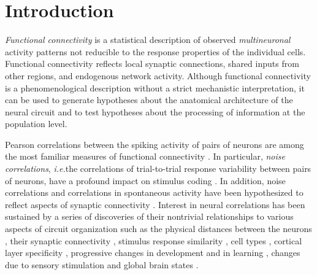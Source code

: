 \section*{Introduction}
\emph{Functional connectivity} is a statistical description of observed \emph{multineuronal} activity patterns not reducible to the response properties of the individual cells. Functional connectivity reflects local synaptic connections, shared inputs from other regions, and endogenous network activity. Although functional connectivity is a phenomenological description without a strict mechanistic interpretation, it can be used to generate hypotheses about the anatomical architecture of the neural circuit and to test hypotheses about the processing of information at the population level.

Pearson correlations between the spiking activity of pairs of neurons are among the most familiar measures of functional connectivity \cite{Averbeck:2006, Zohary:1994, Kohn:2005, Bair:2001, Ecker:2010}.  In particular, \emph{noise correlations}, \emph{i.e.}\;the correlations of trial-to-trial response variability between pairs of neurons, have a profound impact on stimulus coding \cite{Zohary:1994, Abbott:1999, Sompolinsky:2001, Nirenberg:2003, Averbeck:2006, Josic:2009, Berens:2011, Ecker:2011}. In addition, noise correlations and correlations in spontaneous activity have been hypothesized to reflect aspects of synaptic connectivity \cite{Gerstein:1964}.  Interest in neural correlations has been sustained by a series of discoveries of their nontrivial relationships to various aspects of circuit organization such as the physical distances between the neurons \cite{Smith:2008, Denman:2013}, their synaptic connectivity \cite{Ko:2011},  stimulus response similarity \cite{Bair:2001, Arieli:1995, Chiu:2002, Kenet:2003, Kohn:2005, Cohen:2008, Cohen:2009, Ecker:2010, Rothschild:2010, Ko:2011, Smith:2013b}, cell types \cite{Hofer:2011}, cortical layer specificity \cite{Hansen:2012, Smith:2013}, progressive changes in development and in learning \cite{Golshani:2009, Gu:2011, Ko:2013}, changes due to sensory stimulation and global brain states \cite{Greenberg:2008, Goard:2009, Kohn:2009, Rothschild:2010, Ecker:2010, Renart:2010}.


